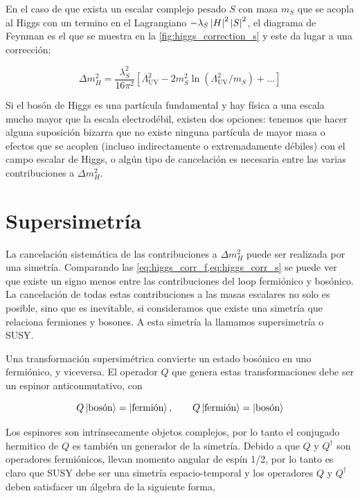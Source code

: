 En el caso de que exista un escalar complejo pesado $S$ con masa $m_S$ que se
acopla al Higgs con un termino en el Lagrangiano $-\lambda_S \left| H \right|^2
\left| S \right|^2$, el diagrama de Feynman es el que se muestra en la
\cref{fig:higgs_correction_s} y este da lugar a una corrección:

\begin{equation}
  \Delta m_H^2 = \frac{\lambda_S^2}{16\pi^2} \left[ \Lambda^2_\text{UV} - 2
    m_S^2 \ln (\Lambda^2_\text{UV}/m_S) + \ldots \right]
  \label{eq:higgs_corr_s}
\end{equation}

Si el bosón de Higgs es una partícula fundamental y hay física a una escala
mucho mayor que la escala electrodébil, existen dos opciones: tenemos que hacer
alguna suposición bizarra que no existe ninguna partícula de mayor masa o
efectos que se acoplen (incluso indirectamente o extremadamente débiles) con el
campo escalar de Higgs, o algún tipo de cancelación es necesaria entre las
varias contribuciones a $\Delta m_H^2$.

\section{Supersimetría}

La cancelación sistemática de las contribuciones a $\Delta m_H^2$ puede ser
realizada por una simetría. Comparando las
\cref{eq:higgs_corr_f,eq:higgs_corr_s} se puede ver que existe un signo menos
entre las contribuciones del loop fermiónico y bosónico. La cancelación de todas
estas contribuciones a las masas escalares no solo es posible, sino que es
inevitable, si consideramos que existe una simetría que relaciona fermiones y
bosones. A esta simetría la llamamos supersimetría o SUSY.

Una transformación supersimétrica convierte un estado bosónico en uno
fermiónico, y viceversa. El operador $Q$ que genera estas transformaciones debe
ser un espinor anticonmutativo, con

\begin{equation}
  Q \left| \text{bosón} \right> = \left| \text{fermión} \right>, \quad \quad Q
  \left| \text{fermión} \right> = \left| \text{bosón} \right>
\end{equation}

Los espinores son intrínsecamente objetos complejos, por lo tanto el conjugado
hermitico de $Q$ es también un generador de la simetría. Debido a que $Q$ y
$Q^\dagger$ son operadores fermiónicos, llevan momento angular de espín 1/2, por
lo tanto es claro que SUSY debe ser una simetría espacio-temporal y los
operadores $Q$ y $Q^\dagger$ deben satisfacer un álgebra de la siguiente forma,

